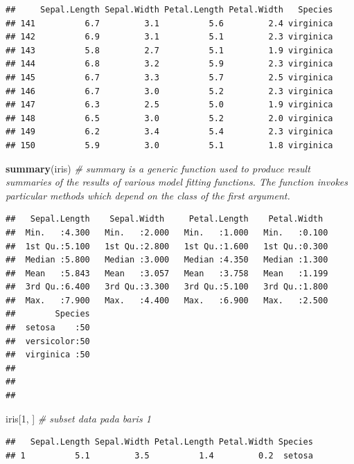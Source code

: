 \documentclass[]{article}
\newenvironment{Shaded}{\begin{snugshade}}{\end{snugshade}}
\newcommand{\CommentTok}[1]{\textcolor[rgb]{0.56,0.35,0.01}{\textit{#1}}}
\newcommand{\DecValTok}[1]{\textcolor[rgb]{0.00,0.00,0.81}{#1}}
\newcommand{\KeywordTok}[1]{\textcolor[rgb]{0.13,0.29,0.53}{\textbf{#1}}}
\newcommand{\NormalTok}[1]{#1}
\begin{document}
\begin{verbatim}
##     Sepal.Length Sepal.Width Petal.Length Petal.Width   Species
## 141          6.7         3.1          5.6         2.4 virginica
## 142          6.9         3.1          5.1         2.3 virginica
## 143          5.8         2.7          5.1         1.9 virginica
## 144          6.8         3.2          5.9         2.3 virginica
## 145          6.7         3.3          5.7         2.5 virginica
## 146          6.7         3.0          5.2         2.3 virginica
## 147          6.3         2.5          5.0         1.9 virginica
## 148          6.5         3.0          5.2         2.0 virginica
## 149          6.2         3.4          5.4         2.3 virginica
## 150          5.9         3.0          5.1         1.8 virginica
\end{verbatim}

\begin{Shaded}
\begin{Highlighting}[]
\KeywordTok{summary}\NormalTok{(iris) }\CommentTok{# summary is a generic function used to produce result summaries of the results of various model fitting functions. The function invokes particular methods which depend on the class of the first argument.}
\end{Highlighting}
\end{Shaded}

\begin{verbatim}
##   Sepal.Length    Sepal.Width     Petal.Length    Petal.Width   
##  Min.   :4.300   Min.   :2.000   Min.   :1.000   Min.   :0.100  
##  1st Qu.:5.100   1st Qu.:2.800   1st Qu.:1.600   1st Qu.:0.300  
##  Median :5.800   Median :3.000   Median :4.350   Median :1.300  
##  Mean   :5.843   Mean   :3.057   Mean   :3.758   Mean   :1.199  
##  3rd Qu.:6.400   3rd Qu.:3.300   3rd Qu.:5.100   3rd Qu.:1.800  
##  Max.   :7.900   Max.   :4.400   Max.   :6.900   Max.   :2.500  
##        Species  
##  setosa    :50  
##  versicolor:50  
##  virginica :50  
##                 
##                 
## 
\end{verbatim}

\begin{Shaded}
\begin{Highlighting}[]
\NormalTok{iris[}\DecValTok{1}\NormalTok{, ] }\CommentTok{# subset data pada baris 1}
\end{Highlighting}
\end{Shaded}

\begin{verbatim}
##   Sepal.Length Sepal.Width Petal.Length Petal.Width Species
## 1          5.1         3.5          1.4         0.2  setosa
\end{verbatim}
\end{document}
